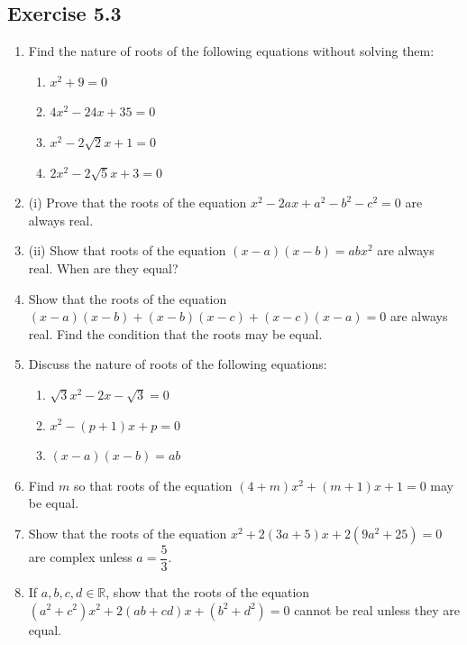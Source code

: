 \documentclass[12pt,a4paper]{article}
\begin{document}
\subsection{Exercise 5.3}

\begin{enumerate}
    \item Find the nature of roots of the following equations without solving them:
    \begin{enumerate}[label=(\roman*)]
        \item \( x^2 + 9 = 0 \)
        \item \( 4x^2 - 24x + 35 = 0 \)
        \item \( x^2 - 2\sqrt{2}x + 1 = 0 \)
        \item \( 2x^2 - 2\sqrt{5}x + 3 = 0 \)
    \end{enumerate}

    \item (i) Prove that the roots of the equation \( x^2 - 2ax + a^2 - b^2 - c^2 = 0 \) are always real.

    \item (ii) Show that roots of the equation \( (x - a)(x - b) = abx^2 \) are always real. When are they equal?

    \item Show that the roots of the equation \( (x - a)(x - b) + (x - b)(x - c) + (x - c)(x - a) = 0 \) are always real. Find the condition that the roots may be equal.

    \item Discuss the nature of roots of the following equations:
    \begin{enumerate}[label=(\roman*)]
        \item \( \sqrt{3}x^2 - 2x - \sqrt{3} = 0 \)
        \item \( x^2 - (p + 1)x + p = 0 \)
        \item \( (x - a)(x - b) = ab \)
    \end{enumerate}

    \item Find \( m \) so that roots of the equation \( (4 + m)x^2 + (m + 1)x + 1 = 0 \) may be equal.

    \item Show that the roots of the equation \( x^2 + 2(3a + 5)x + 2(9a^2 + 25) = 0 \) are complex unless \( a = \dfrac{5}{3} \).

    \item If \( a, b, c, d \in \mathbb{R} \), show that the roots of the equation \( (a^2 + c^2)x^2 + 2(ab + cd)x + (b^2 + d^2) = 0 \) cannot be real unless they are equal.


\end{enumerate}
\end{document}
